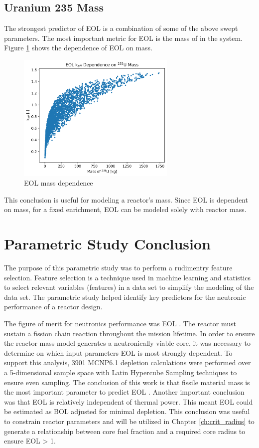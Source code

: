 \subsection{Uranium 235 Mass}
The strongest predictor of EOL \keff is a combination of some of the above
swept parameters. The most important metric for EOL \keff is the mass of \uran
in the system. Figure \ref{fig:eol_keff_vs_235_mass} shows the dependence of EOL
\keff on \uran mass.

\begin{figure}[h]
    \centering
    \includegraphics[width=3in]{../images/keff_vs_mass_235.png}
\caption{EOL \keff \uran mass dependence}
\label{fig:eol_keff_vs_235_mass}
\end{figure}

This conclusion is useful for modeling a reactor's mass. Since EOL \keff is
dependent on \uran mass, for a fixed enrichment, EOL \keff can be modeled 
solely with reactor mass.

\section{Parametric Study Conclusion}
The purpose of this parametric study was to perform a rudimentry feature
selection. Feature selection is a technique used in machine learning and
statistics to select relevant variables (features) in a data set to simplify the
modeling of the data set. The parametric study helped identify key predictors
for the neutronic performance of a reactor design.

The figure of merit for neutronics performance was EOL \keff. The reactor must
sustain a fission chain reaction throughout the mission lifetime. In order to
ensure the reactor mass model generates a neutronically viable core, it was
necessary to determine on which input parameters EOL \keff is most strongly
dependent. To support this analysis, 3901 MCNP6.1 depletion calculations were
performed over a 5-dimensional sample space with Latin Hypercube Sampling
techniques to ensure even sampling. The conclusion of this work is that fissile
material mass is the most important parameter to predict EOL \keff. Another
important conclusion was that EOL \keff is relatively independent of thermal power. This
meant EOL \keff could be estimated as BOL \keff adjusted for minimal depletion.
This conclusion was useful to constrain reactor parameters and will be utilized
in Chapter \ref{ch:crit_radius} to generate a relationship between core fuel fraction
and a required core radius to ensure EOL \keff > 1.
